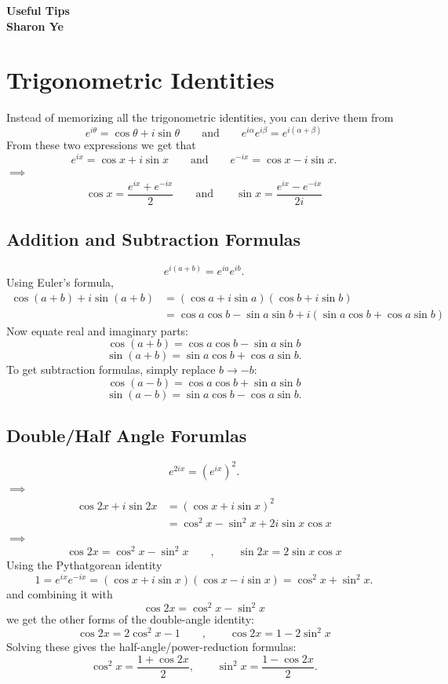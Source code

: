 \documentclass[11pt, answers]{exam}
\begin{document}
	\begin{center}
		\Large \bf Useful Tips \\ Sharon Ye
	\end{center}

    \section{Trigonometric Identities}
    Instead of memorizing all the trigonometric identities, you can derive them from
    \[
    e^{i\theta}=\cos\theta+i\sin\theta \qquad\text{and}\qquad
    e^{i\alpha}e^{i\beta}=e^{i(\alpha+\beta)}
    \]
    From these two expressions we get that
    \[
    e^{ix}=\cos x+i\sin x\qquad\text{and}\qquad
    e^{-ix}=\cos x-i\sin x.
    \]
    $\implies$
    \[
    \boxed{\cos x=\frac{e^{ix}+e^{-ix}}{2}}\qquad\text{and}\qquad
    \boxed{\sin x=\frac{e^{ix}-e^{-ix}}{2i}}
    \]
    \subsection{Addition and Subtraction Formulas}
    \[
    e^{i(a+b)}=e^{ia}e^{ib}.
    \]
    Using Euler's formula,
    \begin{align*}
        \cos(a+b)+i\sin(a+b) &=(\cos a+i\sin a)(\cos b+i\sin b) \\
        &=\cos a\cos b-\sin a\sin b+i(\sin a\cos b+\cos a\sin b)
    \end{align*}
    Now equate real and imaginary parts:
    \[
    \boxed{\cos(a+b)=\cos a\cos b-\sin a\sin b}
    \]\[
    \boxed{\sin(a+b)=\sin a\cos b+\cos a\sin b}.
    \]To get subtraction formulas, simply replace \(b\to-b\):
    \[
    \boxed{\cos(a-b)=\cos a\cos b+\sin a\sin b}
    \]\[
    \boxed{\sin(a-b)=\sin a\cos b-\cos a\sin b}.
    \]

    \subsection{Double/Half Angle Forumlas}
    \[
    e^{2ix}=(e^{ix})^2.
    \]
    $\implies$
    \begin{align*}
        \cos 2x+i\sin 2x &= (\cos x+i\sin x)^2 \\
        &=\cos^2x-\sin^2x+2i\sin x\cos x
    \end{align*}
    $\implies$
    \[
    \boxed{\cos 2x=\cos^2x-\sin^2x}\qquad,\qquad
    \boxed{\sin 2x=2\sin x\cos x}
    \]
    Using the Pythatgorean identity
    \[
    1=e^{ix}e^{-ix}=(\cos x+i\sin x)(\cos x-i\sin x)
    =
    \cos^2x+\sin^2x.
    \]
    and combining it with
    \[
    \cos 2x=\cos^2x-\sin^2x
    \]
    we get the other forms of the double-angle identity:
    \[
    \boxed{\cos2x=2\cos^2x-1}\qquad,\qquad
    \boxed{\cos2x=1-2\sin^2x}
    \]Solving these gives the half-angle/power-reduction formulas:
    \[
    \boxed{\cos^2x=\frac{1+\cos2x}{2}},
    \qquad
    \boxed{\sin^2x=\frac{1-\cos2x}{2}}.
    \]
    
\end{document}
